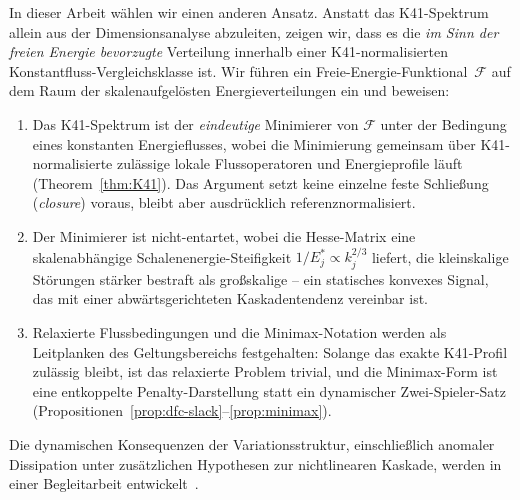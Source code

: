 \documentclass[12pt,a4paper]{article}
\theoremstyle{definition}
\theoremstyle{plain}
\theoremstyle{remark}
\begin{document}
In dieser Arbeit wählen wir einen anderen Ansatz. Anstatt das
K41-Spektrum allein aus der Dimensionsanalyse abzuleiten, zeigen wir, dass es die
\emph{im Sinn der freien Energie bevorzugte} Verteilung innerhalb einer
K41-normalisierten Konstantfluss-Vergleichsklasse ist.
Wir führen ein Freie-Energie-Funktional~$\mathcal{F}$ auf dem Raum der
skalenaufgelösten Energieverteilungen ein und beweisen:
\begin{enumerate}
  \item Das K41-Spektrum ist der \emph{eindeutige} Minimierer von $\mathcal{F}$
        unter der Bedingung eines konstanten Energieflusses, wobei die Minimierung
        gemeinsam über K41-normalisierte zulässige lokale Flussoperatoren und
        Energieprofile läuft (Theorem~\ref{thm:K41}). Das Argument setzt keine
        einzelne feste Schließung (\emph{closure}) voraus, bleibt aber ausdrücklich
        referenznormalisiert.
  \item Der Minimierer ist nicht-entartet, wobei die Hesse-Matrix eine
        skalenabhängige Schalenenergie-Steifigkeit
        $1/E_j^* \propto k_j^{2/3}$ liefert, die
        kleinskalige Störungen stärker bestraft als großskalige -- ein
        statisches konvexes Signal, das mit einer abwärtsgerichteten
        Kaskadentendenz vereinbar ist.
  \item Relaxierte Flussbedingungen und die Minimax-Notation werden als
        Leitplanken des Geltungsbereichs festgehalten: Solange das exakte
        K41-Profil zulässig bleibt, ist das relaxierte Problem trivial, und
        die Minimax-Form ist eine entkoppelte Penalty-Darstellung statt ein
        dynamischer Zwei-Spieler-Satz
        (Propositionen~\ref{prop:dfc-slack}--\ref{prop:minimax}).
\end{enumerate}
Die dynamischen Konsequenzen der Variationsstruktur, einschließlich
anomaler Dissipation unter zusätzlichen Hypothesen zur nichtlinearen
Kaskade, werden in einer Begleitarbeit entwickelt~\cite{Geiger2026b}.
\end{document}
